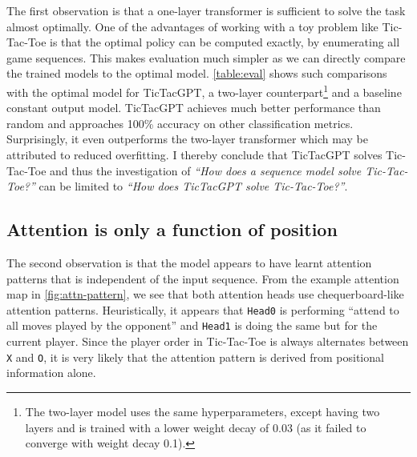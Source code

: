 \documentclass{article}
\newcommand{\ttgpt}{TicTacGPT\xspace}
\newcommand{\ttt}{Tic-Tac-Toe\xspace}
\newcounter{num}
\begin{document}
The first observation is that a one-layer transformer is sufficient to solve the task almost optimally. One of the advantages of working with a toy problem like \ttt is that the optimal policy can be computed exactly, by enumerating all game sequences. This makes evaluation much simpler as we can directly compare the trained models to the optimal model. \cref{table:eval} shows such comparisons with the optimal model for \ttgpt, a two-layer counterpart\footnote{The two-layer model uses the same hyperparameters, except having two layers and is trained with a lower weight decay of 0.03 (as it failed to converge with weight decay 0.1).} and a baseline constant output model. \ttgpt achieves much better performance than random and approaches 100\% accuracy on other classification metrics. Surprisingly, it even outperforms the two-layer transformer which may be attributed to reduced overfitting. I thereby conclude that \ttgpt solves \ttt and thus the investigation of \emph{``How does a sequence model solve \ttt?''} can be limited to \emph{``How does \ttgpt solve \ttt?''}.

\subsection{Attention is only a function of position} \label{sec:simplify-attn}



The second observation is that the model appears to have learnt attention patterns that is independent of the input sequence. From the example attention map in \cref{fig:attn-pattern}, we see that both attention heads use chequerboard-like attention patterns. Heuristically, it appears that \texttt{Head0} is performing ``attend to all moves played by the opponent'' and \texttt{Head1} is doing the same but for the current player. Since the player order in \ttt is always alternates between \texttt{X} and \texttt{O}, it is very likely that the attention pattern is derived from positional information alone.
\end{document}
